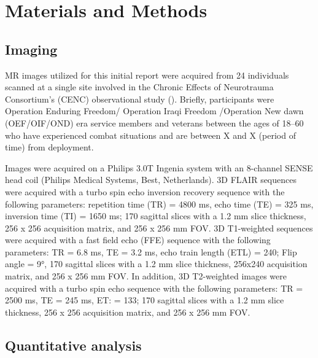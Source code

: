\documentclass[11pt,]{article}
\begin{document}
\section{Materials and Methods}\label{materials-and-methods}

\subsection{Imaging}\label{imaging}

MR images utilized for this initial report were acquired from 24
individuals scanned at a single site involved in the Chronic Effects of
Neurotrauma Consortium's (CENC) observational study
().
Briefly, participants were Operation Enduring Freedom/ Operation Iraqi
Freedom /Operation New dawn (OEF/OIF/OND) era service members and
veterans between the ages of 18--60 who have experienced combat
situations and are between X and X (period of time) from deployment.

Images were acquired on a Philips 3.0T Ingenia system with an 8-channel
SENSE head coil (Philips Medical Systems, Best, Netherlands). 3D FLAIR
sequences were acquired with a turbo spin echo inversion recovery
sequence with the following parameters: repetition time (TR) = 4800 ms,
echo time (TE) = 325 ms, inversion time (TI) = 1650 ms; 170 sagittal
slices with a 1.2 mm slice thickness, 256 x 256 acquisition matrix, and
256 x 256 mm FOV. 3D T1-weighted sequences were acquired with a fast
field echo (FFE) sequence with the following parameters: TR = 6.8 ms, TE
= 3.2 ms, echo train length (ETL) = 240; Flip angle = 9°, 170 sagittal
slices with a 1.2 mm slice thickness, 256x240 acquisition matrix, and
256 x 256 mm FOV. In addition, 3D T2-weighted images were acquired with
a turbo spin echo sequence with the following parameters: TR = 2500 ms,
TE = 245 ms, ET: = 133; 170 sagittal slices with a 1.2 mm slice
thickness, 256 x 256 acquisition matrix, and 256 x 256 mm FOV.

\subsection{Quantitative analysis}\label{quantitative-analysis}
\end{document}
